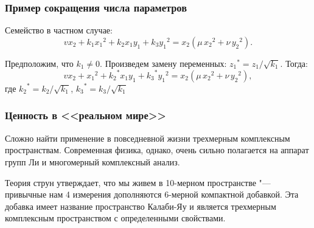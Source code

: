 \documentclass[russian,hyperref={unicode}]{beamer}
\newcommand{\backupend}{
   \setcounter{framenumber}{\value{finalframe}}
}
\begin{document}
\frame
{
	\frametitle{Пример сокращения числа параметров}
	Семейство в частном случае:
	$$
	v x_2 + k_1 {x_1}^2 + k_2 x_1 y_1 + k_3 {y_1}^2 = x_2 (\mu\,{x_2}^2 + \nu\,{y_2}^2).
	$$

	Предположим, что $k_1 \ne 0$. Произведем замену переменных: ${z_1}^* = z_1 / \sqrt{k_1}$. Тогда:
		$$
	v x_2 + {x_1}^2 + {k_2}^* x_1 y_1 + {k_3}^* {y_1}^2 = x_2 (\mu\,{x_2}^2 + \nu\,{y_2}^2),
	$$
	где ${k_2}^* = k_2 / \sqrt{k_1}$, ${k_3}^* = k_3 / \sqrt{k_1}$
}
\frame
{
	\frametitle{Ценность в <<реальном мире>>}
	Сложно найти применение в повседневной жизни трехмерным комплексным пространствам. Современная физика, однако, очень сильно полагается на аппарат групп Ли и многомерный комплексный анализ.

	Теория струн утверждает, что мы живем в 10-мерном пространстве "--- привычные нам 4 измерения дополняются 6-мерной компактной добавкой. Эта добавка имеет название пространство Калаби-Яу и является трехмерным комплексным пространством с определенными свойствами.
}
\backupend
\end{document}
